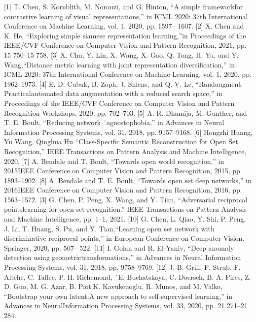 \documentclass{gji}
\begin{document}
\begin{thebibliography}{}
 [1] T. Chen, S. Kornblith, M. Norouzi, and G. Hinton, “A simple frameworkfor contrastive learning of visual representations,” in ICML 2020: 37th International Conference on Machine Learning, vol. 1, 2020, pp. 1597– 1607.
    [2] X. Chen and K. He, “Exploring simple siamese representation learning,”in Proceedings of the IEEE/CVF Conference on Computer Vision and Pattern Recognition, 2021, pp. 15 750–15 758.
    [3] X. Chu, Y. Lin, X. Wang, X. Gao, Q. Tong, H. Yu, and Y. Wang,“Distance metric learning with joint representation diversification,” in ICML 2020: 37th International Conference on Machine Learning, vol. 1, 2020, pp. 1962–1973.
   [4] E. D. Cubuk, B. Zoph, J. Shlens, and Q. V. Le, “Randaugment: Practicalautomated data augmentation with a reduced search space,” in Proceedings of the IEEE/CVF Conference on Computer Vision and Pattern Recognition Workshops, 2020, pp. 702–703.
   [5] A. R. Dhamija, M. Gunther, and T. E. Boult, “Reducing network ¨agnostophobia,” in Advances in Neural Information Processing Systems, vol. 31, 2018, pp. 9157–9168.
   [6] Hongzhi Huang, Yu Wang, Qinghua Hu “Class-Specific Semantic Reconstruction for
Open Set Recognition,” IEEE Transactions on Pattern Analysis and Machine Intelligence, 2020. 
 [7] A. Bendale and T. Boult, “Towards open world recognition,” in 2015IEEE Conference on Computer Vision and Pattern Recognition, 2015, pp. 1893–1902.
    [8] A. Bendale and T. E. Boult, “Towards open set deep networks,” in 2016IEEE Conference on Computer Vision and Pattern Recognition, 2016, pp. 1563–1572. [3] G. Chen, P. Peng, X. Wang, and Y. Tian, “Adversarial reciprocal pointslearning for open set recognition.” IEEE Transactions on Pattern Analysis and Machine Intelligence, pp. 1–1, 2021.
    [10] G. Chen, L. Qiao, Y. Shi, P. Peng, J. Li, T. Huang, S. Pu, and Y. Tian,“Learning open set network with discriminative reciprocal points,” in European Conference on Computer Vision. Springer, 2020, pp. 507– 522.
 [11] I. Golan and R. El-Yaniv, “Deep anomaly detection using geometrictransformations,” in Advances in Neural Information Processing Systems, vol. 31, 2018, pp. 9758–9769.
 [12] J.-B. Grill, F. Strub, F. Altche, C. Tallec, P. H. Richemond, ´E. Buchatskaya, C. Doersch, B. A. Pires, Z. D. Guo, M. G. Azar, B. Piot,K. Kavukcuoglu, R. Munos, and M. Valko, “Bootstrap your own latent:A new approach to self-supervised learning,” in Advances in NeuralInformation Processing Systems, vol. 33, 2020, pp. 21 271–21 284. 

\end{thebibliography}
\end{document}
